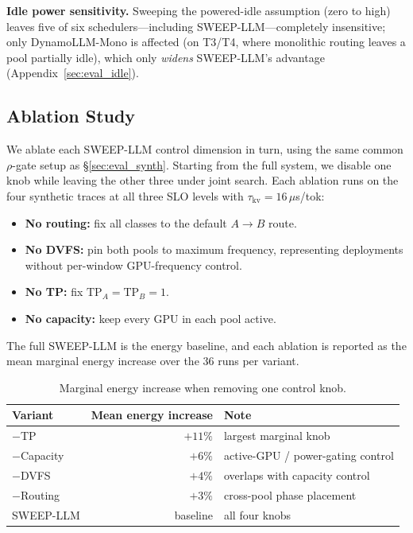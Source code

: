\textbf{Idle power sensitivity.}
Sweeping the powered-idle assumption (zero to high) leaves five of six schedulers---including SWEEP-LLM---completely insensitive; only DynamoLLM-Mono is affected (on T3/T4, where monolithic routing leaves a pool partially idle), which only \emph{widens} SWEEP-LLM's advantage (Appendix~\ref{sec:eval_idle}).
\fi

\subsection{Ablation Study}
\label{sec:eval_ablation}

We ablate each SWEEP-LLM control dimension in turn, using the same common $\rho$-gate setup as \S\ref{sec:eval_synth}.
Starting from the full system, we disable one knob while leaving the other three under joint search.
Each ablation runs on the four synthetic traces at all three SLO levels with $\tau_{\mathrm{kv}}{=}16$\,$\mu$s/tok:
\begin{itemize}[leftmargin=*,itemsep=0pt,topsep=0pt]
    \item \textbf{No routing:} fix all classes to the default $A{\to}B$ route.
    \item \textbf{No DVFS:} pin both pools to maximum frequency, representing deployments without per-window GPU-frequency control.
    \item \textbf{No TP:} fix $\mathrm{TP}_A{=}\mathrm{TP}_B{=}1$.
    \item \textbf{No capacity:} keep every GPU in each pool active.
\end{itemize}
The full SWEEP-LLM is the energy baseline, and each ablation is reported as the mean marginal energy increase over the $36$ runs per variant.


\begin{table}[t]
\centering
\caption{Marginal energy increase when removing one control knob.}
\label{tab:ablation}
\small
\begin{tabular}{@{}lrl@{}}
\toprule
Variant & Mean energy increase & Note \\
\midrule
$-$TP        & $+11\%$ & largest marginal knob \\
$-$Capacity  & $+6\%$  & active-GPU / power-gating control \\
$-$DVFS      & $+4\%$  & overlaps with capacity control \\
$-$Routing   & $+3\%$  & cross-pool phase placement \\
SWEEP-LLM    & baseline & all four knobs \\
\bottomrule
\end{tabular}
\end{table}


